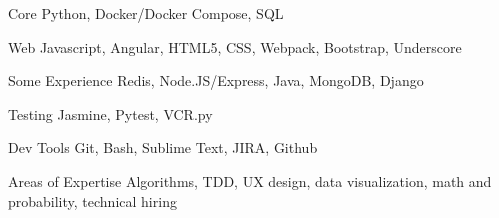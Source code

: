 

\begin{cvskills}

  \cvskill
    {Core}
    {Python, Docker/Docker Compose, SQL}

  \cvskill
    {Web}
    {Javascript, Angular, HTML5, CSS, Webpack, Bootstrap, Underscore}

  \cvskill
    {Some Experience}
    {Redis, Node.JS/Express, Java, MongoDB, Django}

  \cvskill
    {Testing}
    {Jasmine, Pytest, VCR.py}

  \cvskill
    {Dev Tools}
    {Git, Bash, Sublime Text, JIRA, Github}

  \cvskill
    {Areas of Expertise}
    {Algorithms, TDD, UX design, data visualization, math and probability, technical hiring}

\end{cvskills}
